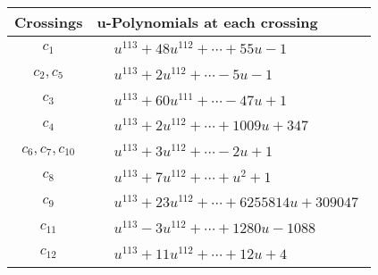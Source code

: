 \documentclass[1p]{elsarticle_modified}
\theoremstyle{definition}
\begin{document}
\begin{tabular}{m{50pt}|m{274pt}}
Crossings & \hspace{64pt}u-Polynomials at each crossing \\
\hline $$\begin{aligned}c_{1}\end{aligned}$$&$\begin{aligned}
&u^{113}+48 u^{112}+\cdots+55 u-1
\end{aligned}$\\
\hline $$\begin{aligned}c_{2},c_{5}\end{aligned}$$&$\begin{aligned}
&u^{113}+2 u^{112}+\cdots-5 u-1
\end{aligned}$\\
\hline $$\begin{aligned}c_{3}\end{aligned}$$&$\begin{aligned}
&u^{113}+60 u^{111}+\cdots-47 u+1
\end{aligned}$\\
\hline $$\begin{aligned}c_{4}\end{aligned}$$&$\begin{aligned}
&u^{113}+2 u^{112}+\cdots+1009 u+347
\end{aligned}$\\
\hline $$\begin{aligned}c_{6},c_{7},c_{10}\end{aligned}$$&$\begin{aligned}
&u^{113}+3 u^{112}+\cdots-2 u+1
\end{aligned}$\\
\hline $$\begin{aligned}c_{8}\end{aligned}$$&$\begin{aligned}
&u^{113}+7 u^{112}+\cdots+u^2+1
\end{aligned}$\\
\hline $$\begin{aligned}c_{9}\end{aligned}$$&$\begin{aligned}
&u^{113}+23 u^{112}+\cdots+6255814 u+309047
\end{aligned}$\\
\hline $$\begin{aligned}c_{11}\end{aligned}$$&$\begin{aligned}
&u^{113}-3 u^{112}+\cdots+1280 u-1088
\end{aligned}$\\
\hline $$\begin{aligned}c_{12}\end{aligned}$$&$\begin{aligned}
&u^{113}+11 u^{112}+\cdots+12 u+4
\end{aligned}$\\
\hline
\end{tabular}\\~\\
\end{document}
